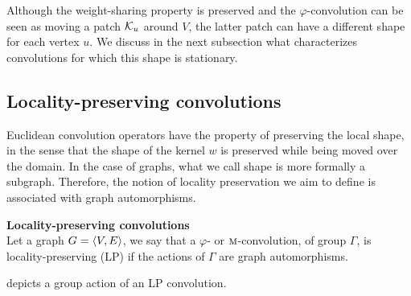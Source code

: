 Although the weight-sharing property is preserved and the $\varphi$-convolution can be seen as moving a patch $\mathcal{K}_u$ around $V$, the latter patch can have a different shape for each vertex $u$. We discuss in the next subsection what characterizes convolutions for which this shape is stationary.

\subsection{Locality-preserving convolutions}

Euclidean convolution operators have the property of preserving the local shape, in the sense that the shape of the kernel $w$ is preserved while being moved over the domain. In the case of graphs, what we call shape is more formally a subgraph. Therefore, the notion of locality preservation we aim to define is associated with graph automorphisms.

\begin{definition}\textbf{Locality-preserving convolutions}\\
Let a graph $G = \langle V, E \rangle$, we say that a $\varphi$- or $\operatorname{\textsc{m}}$-convolution, of group $\Gamma$, is locality-preserving (LP) if the actions of $\Gamma$ are graph automorphisms.
\end{definition}

 depicts a group action of an LP convolution.


